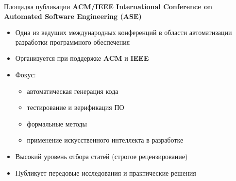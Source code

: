 \begin{frame}{Площадка публикации}
\textbf{ACM/IEEE International Conference on Automated Software Engineering (ASE)}

\vspace{0.5cm}

\begin{itemize}
  \item Одна из ведущих международных конференций в области автоматизации разработки программного обеспечения
  \item Организуется при поддержке \textbf{ACM} и \textbf{IEEE}
  \item Фокус: 
  \begin{itemize}
    \item автоматическая генерация кода
    \item тестирование и верификация ПО
    \item формальные методы
    \item применение искусственного интеллекта в разработке
  \end{itemize}
  \item Высокий уровень отбора статей (строгое рецензирование)
  \item Публикует передовые исследования и практические решения
\end{itemize}

\end{frame}